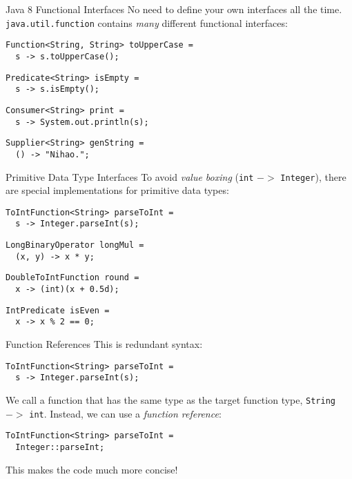 \documentclass{beamer}
\begin{document}
\begin{frame}[fragile]{Java 8 Functional Interfaces}
No need to define your own interfaces all the time. \lstinline{java.util.function} contains \emph{many} different functional interfaces:

\pause{}\begin{lstlisting}
Function<String, String> toUpperCase =
  s -> s.toUpperCase();
\end{lstlisting}
\pause{}\begin{lstlisting}
Predicate<String> isEmpty =
  s -> s.isEmpty();
\end{lstlisting}
\pause{}\begin{lstlisting}
Consumer<String> print =
  s -> System.out.println(s);
\end{lstlisting}
\pause{}\begin{lstlisting}
Supplier<String> genString =
  () -> "Nihao.";
\end{lstlisting}
\end{frame}

\begin{frame}[fragile]{Primitive Data Type Interfaces}
To avoid \emph{value boxing} (\lstinline{int} $->$ \lstinline{Integer}), there are special implementations for primitive data types:

\pause{}\begin{lstlisting}
ToIntFunction<String> parseToInt =
  s -> Integer.parseInt(s);
\end{lstlisting}
\pause{}\begin{lstlisting}
LongBinaryOperator longMul =
  (x, y) -> x * y;
\end{lstlisting}
\pause{}\begin{lstlisting}
DoubleToIntFunction round =
  x -> (int)(x + 0.5d);
\end{lstlisting}
\pause{}\begin{lstlisting}
IntPredicate isEven =
  x -> x % 2 == 0;
\end{lstlisting}
\end{frame}

\begin{frame}[fragile]{Function References}
This is redundant syntax:
\begin{lstlisting}
ToIntFunction<String> parseToInt =
  s -> Integer.parseInt(s);
\end{lstlisting}

\pause{} We call a function that has the same type as the target function type, \lstinline{String} $->$ \lstinline{int}. Instead, we can use a \emph{function reference}: \pause{}

\begin{lstlisting}
ToIntFunction<String> parseToInt =
  Integer::parseInt;
\end{lstlisting}

This makes the code much more concise!
\end{frame}
\end{document}
